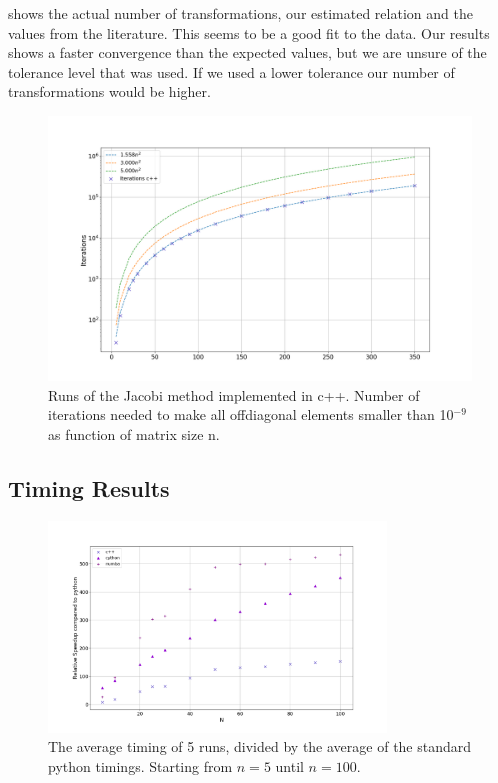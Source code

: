  shows the
actual number of transformations, our estimated relation and the values from the
literature. This seems to be a good fit to the data. Our results shows a faster
convergence than the expected values, but we are unsure of the tolerance level
that was used. If we used a lower tolerance our number of transformations would
be higher.




\begin{figure}[H]
  \centering
  \includegraphics[width=1.0\textwidth]{../figures/iterations.png}

  \caption{Runs of the Jacobi method implemented in c++. Number of iterations
  needed to make all offdiagonal elements smaller than 10$^{-9}$ as function of
  matrix size n.}

  \label{fig:iterations}
\end{figure}


\subsection*{Timing Results}

\begin{figure}[H]
  \centering
  \includegraphics[width=0.8\textwidth]{../figures/avgspeed.png}
  \caption{ The average timing of 5 runs, divided by the average of the standard
  python timings. Starting from $n=5$ until $n=100$. }
  \label{fig:comp_python}
\end{figure}

